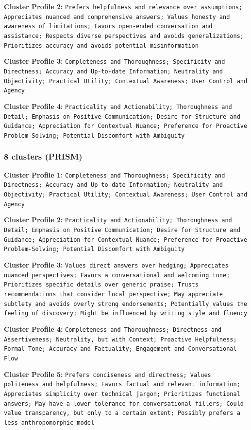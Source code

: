 \documentclass[11pt]{article}
\begin{document}
\textbf{Cluster Profile 2:} \texttt{Prefers helpfulness and relevance over assumptions; Appreciates nuanced and comprehensive answers; Values honesty and awareness of limitations; Favors open-ended conversation and assistance; Respects diverse perspectives and avoids generalizations; Prioritizes accuracy and avoids potential misinformation}

\textbf{Cluster Profile 3:} \texttt{Completeness and Thoroughness; Specificity and Directness; Accuracy and Up-to-date Information; Neutrality and Objectivity; Practical Utility; Contextual Awareness; User Control and Agency}

\textbf{Cluster Profile 4:} \texttt{Practicality and Actionability; Thoroughness and Detail; Emphasis on Positive Communication; Desire for Structure and Guidance; Appreciation for Contextual Nuance; Preference for Proactive Problem-Solving; Potential Discomfort with Ambiguity}

\subsubsection{8 clusters (PRISM)}

\textbf{Cluster Profile 1:} \texttt{Completeness and Thoroughness; Specificity and Directness; Accuracy and Up-to-date Information; Neutrality and Objectivity; Practical Utility; Contextual Awareness; User Control and Agency}

\textbf{Cluster Profile 2:} \texttt{Practicality and Actionability; Thoroughness and Detail; Emphasis on Positive Communication; Desire for Structure and Guidance; Appreciation for Contextual Nuance; Preference for Proactive Problem-Solving; Potential Discomfort with Ambiguity}

\textbf{Cluster Profile 3:} \texttt{Values direct answers over hedging; Appreciates nuanced perspectives; Favors a conversational and welcoming tone; Prioritizes specific details over generic praise; Trusts recommendations that consider local perspective; May appreciate subtlety and avoids overly strong endorsements; Potentially values the feeling of discovery; Might be influenced by writing style and fluency}

\textbf{Cluster Profile 4:} \texttt{Completeness and Thoroughness; Directness and Assertiveness; Neutrality, but with Context; Proactive Helpfulness; Formal Tone; Accuracy and Factuality; Engagement and Conversational Flow}

\textbf{Cluster Profile 5:} \texttt{Prefers conciseness and directness; Values politeness and helpfulness; Favors factual and relevant information; Appreciates simplicity over technical jargon; Prioritizes functional answers; May have a lower tolerance for conversational fillers; Could value transparency, but only to a certain extent; Possibly prefers a less anthropomorphic model}
\end{document}
